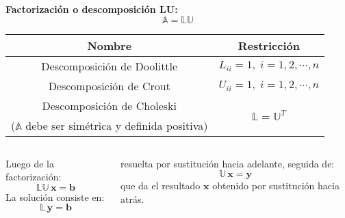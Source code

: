 \documentclass[9pt, aspectratio=169]{beamer}
\begin{document}
\begin{frame}
\textbf{Factorización o descomposición LU:}
 \begin{equation*}
  \mathbb{A} = \mathbb{L U} 
 \end{equation*}
 
 \begin{center}
\begin{tabular}{c c}
\toprule
\textbf{Nombre} & \textbf{Restricción} \\
\midrule
Descomposición de Doolittle & $L_{ii} = 1, \; i = 1, 2, \cdots,n$ \\
Descomposición de Crout & $U_{ii} = 1, \; i = 1, 2, \cdots,n$ \\
Descomposición de Choleski & \multirow{2}{*}{$\mathbb{L} = \mathbb{U}^T$} \\
{\small ($\mathbb{A}$ debe ser simétrica y definida positiva)} & \\
\bottomrule
\end{tabular} 
\end{center}
\vspace{2em}

\begin{columns}[t]
Luego de la factorización:
\begin{equation*}
 \mathbb{LU} \, \bm{x} = \bm{b}
\end{equation*}
La solución consiste en:
\begin{equation*}
 \mathbb{L} \, \bm{y} = \bm{b}
\end{equation*}

resuelta por sustitución hacia adelante, seguida de:
\begin{equation*}
 \mathbb{U} \, \bm{x} = \bm{y}
\end{equation*}
que da el resultado $\bm{x}$ obtenido por sustitución hacia atrás.
\end{columns}
\end{frame}
\end{document}
